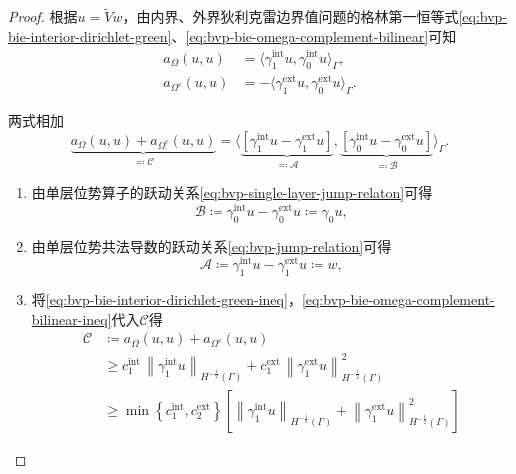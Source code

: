 \begin{proof}
根据$u = \widetilde{V} w$，由内界、外界狄利克雷边界值问题的格林第一恒等式\eqref{eq:bvp-bie-interior-dirichlet-green}、\eqref{eq:bvp-bie-omega-complement-bilinear}可知
\begin{equation*}
  \begin{split}
    a_{\Omega}(u,u) & = \langle \gamma_{1}^{\text{int}} u, \gamma_{0}^{\text{int}} u \rangle_{\Gamma}, \\
    a_{\Omega^{c}}(u,u) & = - \langle \gamma_{1}^{\text{ext}} u, \gamma_{0}^{\text{ext}} u \rangle_{\Gamma}.
  \end{split}
\end{equation*}

两式相加
\begin{equation*}
  \underbrace{
  a_{\Omega}(u,u) + a_{\Omega^{c}}(u,u)
  }_{\eqqcolon \mathcal{C}}
  = \langle
  \underbrace{
  \left[ \gamma_{1}^{\text{int}} u - \gamma_{1}^{\text{ext}} u \right]
  }_{\eqqcolon \mathcal{A}}
  ,
  \underbrace{
  \left[ \gamma_{0}^{\text{int}} u - \gamma_{0}^{\text{ext}} u \right]
  }_{\eqqcolon \mathcal{B}}
  \rangle_{\Gamma}.
\end{equation*}


\begin{enumerate}
  \item 由单层位势算子的跃动关系\eqref{eq:bvp-single-layer-jump-relaton}可得
\begin{equation*}
  \mathcal{B} \coloneqq \gamma_{0}^{\text{int}} u - \gamma_{0}^{\text{ext}} u \coloneqq \gamma_{0} u,
\end{equation*}

\item 由单层位势共法导数的跃动关系\eqref{eq:bvp-jump-relation}可得
\begin{equation*}
  \mathcal{A} \coloneqq \gamma_{1}^{\text{int}} u - \gamma_{1}^{\text{ext}} u \coloneqq w,
\end{equation*}

\item 将\eqref{eq:bvp-bie-interior-dirichlet-green-ineq}，\eqref{eq:bvp-bie-omega-complement-bilinear-ineq}代入$\mathcal{C}$得
\begin{equation*} \begin{split}
  \mathcal{C} &\coloneqq a_{\Omega}(u,u) + a_{\Omega^{c}}(u,u) \\
  & \ge c_{1}^{\text{int}} \,
  \left\| \gamma_{1}^{\text{int}} u \right\|_{H^{-\frac{1}{2}}(\Gamma)}
  + c_{1}^{\text{ext}} \,
  \left\| \gamma_{1}^{\text{ext}} u \right\|_{H^{-\frac{1}{2}}(\Gamma)}^{2} \\
  & \ge \min \left\{ c_{1}^{\text{int}}, c_{2}^{\text{ext}} \right\}
  \left[
   \left\| \gamma_{1}^{\text{int}} u \right\|_{H^{-\frac{1}{2}}(\Gamma)}
   +
   \left\| \gamma_{1}^{\text{ext}} u \right\|_{H^{-\frac{1}{2}}(\Gamma)}^{2}
  \right]
\end{split}
\end{equation*}
\end{enumerate}


\end{proof}
